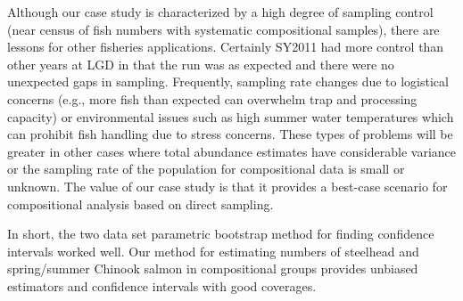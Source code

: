 \documentclass[%
                leqno,         %
%
]{nrc1}                          %
\begin{document}
Although our case study is characterized by a high degree of sampling control (near census of fish numbers with systematic compositional samples), there are lessons for other fisheries applications. Certainly SY2011 had more control than other years at LGD in that the run was as expected and there were no unexpected gaps in sampling. Frequently, sampling rate changes due to logistical concerns (e.g., more fish than expected can overwhelm trap and processing capacity) or environmental issues such as high summer water temperatures which can prohibit fish handling due to stress concerns. These types of problems will be greater in other cases where total abundance estimates have considerable variance or the sampling rate of the population for compositional data is small or unknown. The value of our case study is that it provides a best-case scenario for compositional analysis based on direct sampling.

In short, the two data set parametric bootstrap method for finding confidence intervals worked well. Our method for estimating numbers of steelhead and spring/summer Chinook salmon in compositional groups provides unbiased estimators and confidence intervals with good coverages.



\end{document}
